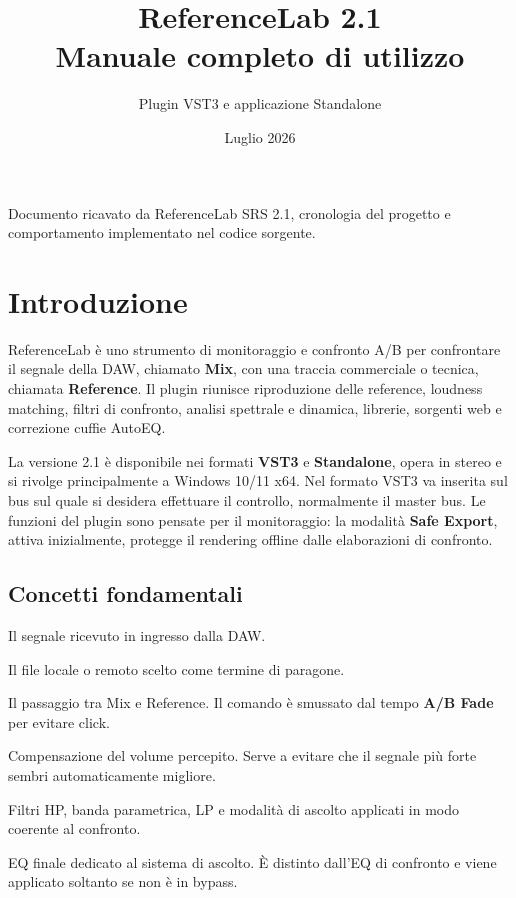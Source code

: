 \documentclass[11pt,a4paper]{article}
\title{\vspace{-15mm}\textbf{ReferenceLab 2.1}\\[2mm]
\Large Manuale completo di utilizzo}
\author{Plugin VST3 e applicazione Standalone}
\date{Luglio 2026}
\newcommand{\control}[1]{\textbf{\textsf{#1}}}
\newcommand{\mix}{\textcolor{MixBlue}{\textbf{Mix}}}
\newcommand{\reference}{\textcolor{ReferenceOrange}{\textbf{Reference}}}
\begin{document}
\maketitle

\begin{center}
\small Documento ricavato da ReferenceLab SRS 2.1, cronologia del progetto e
comportamento implementato nel codice sorgente.
\end{center}

\tableofcontents
\newpage

\section{Introduzione}

ReferenceLab è uno strumento di monitoraggio e confronto A/B per confrontare il
segnale della DAW, chiamato \mix, con una traccia commerciale o tecnica,
chiamata \reference. Il plugin riunisce riproduzione delle reference, loudness
matching, filtri di confronto, analisi spettrale e dinamica, librerie, sorgenti
web e correzione cuffie AutoEQ.

La versione 2.1 è disponibile nei formati \textbf{VST3} e
\textbf{Standalone}, opera in stereo e si rivolge principalmente a Windows
10/11 x64. Nel formato VST3 va inserita sul bus sul quale si desidera effettuare
il controllo, normalmente il master bus. Le funzioni del plugin sono pensate
per il monitoraggio: la modalità \control{Safe Export}, attiva inizialmente,
protegge il rendering offline dalle elaborazioni di confronto.

\subsection{Concetti fondamentali}

\begin{description}[style=nextline]
  \item[\mix] Il segnale ricevuto in ingresso dalla DAW.
  \item[\reference] Il file locale o remoto scelto come termine di paragone.
  \item[A/B] Il passaggio tra Mix e Reference. Il comando è smussato dal tempo
  \control{A/B Fade} per evitare click.
  \item[Loudness matching] Compensazione del volume percepito. Serve a evitare
  che il segnale più forte sembri automaticamente migliore.
  \item[Processing di confronto] Filtri HP, banda parametrica, LP e modalità di
  ascolto applicati in modo coerente al confronto.
  \item[Correzione cuffie] EQ finale dedicato al sistema di ascolto. È distinto
  dall'EQ di confronto e viene applicato soltanto se non è in bypass.
\end{description}
\end{document}
